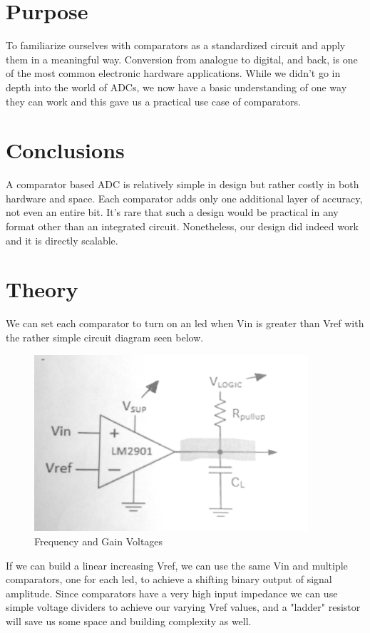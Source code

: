 \documentclass[prb,preprint]{revtex4-1}
\begin{document}
\section{Purpose}
To familiarize ourselves with comparators as a standardized circuit and apply them in a meaningful way. Conversion from analogue to digital, and back, is one of the most common electronic hardware applications. While we didn't go in depth into the world of ADCs, we now have a basic understanding of one way they can work and this gave us a practical use case of comparators.

\section{Conclusions}
A comparator based ADC is relatively simple in design but rather costly in both hardware and space. Each comparator adds only one additional layer of accuracy, not even an entire bit. It's rare that such a design would be practical in any format other than an integrated circuit. Nonetheless, our design did indeed work and it is directly scalable.

\section{Theory}
We can set each comparator to turn on an led when Vin is greater than Vref with the rather simple circuit diagram seen below.

\begin{figure}[ht]
\centering
\includegraphics[width=4in]{schem.png}
\caption{Frequency and Gain Voltages}
\label{fig1}
\end{figure}

If we can build a linear increasing Vref, we can use the same Vin and multiple comparators, one for each led, to achieve a shifting binary output of signal amplitude. Since comparators have a very high input impedance we can use simple voltage dividers to achieve our varying Vref values, and a "ladder" resistor will save us some space and building complexity as well.
\end{document}
